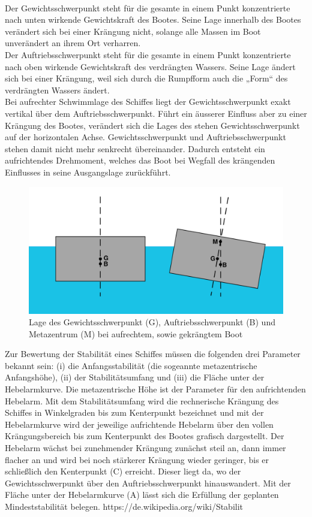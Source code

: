 \\Der Gewichtsschwerpunkt steht für die gesamte in einem Punkt konzentrierte nach unten wirkende Gewichtskraft des Bootes. Seine Lage innerhalb des Bootes  verändert sich bei einer Krängung nicht, solange alle Massen im Boot unverändert an ihrem Ort verharren. \\
Der Auftriebsschwerpunkt steht für die gesamte in einem Punkt konzentrierte nach oben wirkende Gewichtskraft des verdrängten Wassers. Seine Lage ändert sich bei einer Krängung, weil sich durch die Rumpfform auch die „Form“ des verdrängten Wassers ändert.\\
Bei aufrechter Schwimmlage des Schiffes liegt der Gewichtsschwerpunkt exakt vertikal über dem Auftriebsschwerpunkt. Führt ein äusserer Einfluss aber zu einer Krängung des Bootes, verändert sich die Lages des  stehen Gewichtsschwerpunkt auf der horizontalen Achse. Gewichtsschwerpunkt und Auftriebsschwerpunkt stehen  damit nicht mehr senkrecht übereinander. Dadurch entsteht ein aufrichtendes Drehmoment, welches das Boot bei Wegfall des krängenden Einflusses in seine Ausgangslage zurückführt. 
\begin{figure}
    \centering
    \includegraphics[width=0.5\linewidth]{Metacentriskhojd-svg.svg.png}
    \caption{Lage des Gewichtsschwerpunkt (G), Auftriebsschwerpunkt (B) und Metazentrum (M) bei aufrechtem, sowie gekrängtem Boot }
    \label{fig:enter-label}
\end{figure}
Zur Bewertung der Stabilität eines Schiffes müssen die folgenden drei Parameter bekannt sein: (i) die Anfangsstabilität (die sogeannte metazentrische Anfangshöhe), (ii) der Stabilitätsumfang und (iii) die Fläche unter der Hebelarmkurve. Die metazentrische Höhe ist der Parameter für den aufrichtenden Hebelarm. Mit dem Stabilitätsumfang wird die rechnerische Krängung des Schiffes in Winkelgraden bis zum Kenterpunkt bezeichnet und mit der Hebelarmkurve wird der jeweilige aufrichtende Hebelarm über den vollen Krängungsbereich bis zum Kenterpunkt des Bootes grafisch dargestellt. Der Hebelarm wächst bei zunehmender Krängung zunächst steil an, dann immer flacher an und wird bei noch stärkerer Krängung wieder geringer, bis er schließlich den Kenterpunkt (C) erreicht. Dieser liegt da, wo der Gewichtsschwerpunkt über den Auftriebsschwerpunkt hinauswandert. Mit der Fläche unter der Hebelarmkurve (A) lässt sich die Erfüllung der geplanten Mindeststabilität belegen.  https://de.wikipedia.org/wiki/Stabilit%

